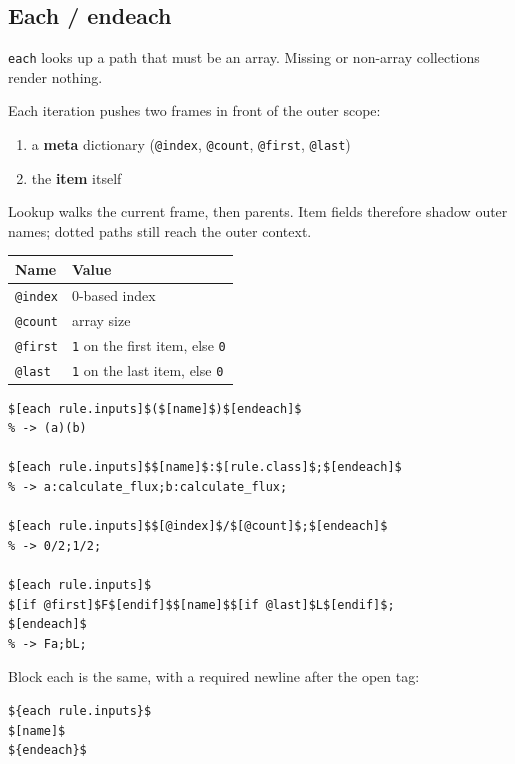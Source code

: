 \documentclass[11pt,letterpaper]{article}
\begin{document}
\subsection{Each / endeach}

\texttt{each} looks up a path that must be an array. Missing or non-array
collections render nothing.

Each iteration pushes two frames in front of the outer scope:

\begin{enumerate}[nosep]
  \item a \textbf{meta} dictionary (\texttt{@index}, \texttt{@count},
        \texttt{@first}, \texttt{@last})
  \item the \textbf{item} itself
\end{enumerate}

Lookup walks the current frame, then parents. Item fields therefore shadow
outer names; dotted paths still reach the outer context.

\begin{center}
\begin{tabular}{ll}
\toprule
Name & Value \\
\midrule
\texttt{@index} & 0-based index \\
\texttt{@count} & array size \\
\texttt{@first} & \texttt{1} on the first item, else \texttt{0} \\
\texttt{@last}  & \texttt{1} on the last item, else \texttt{0} \\
\bottomrule
\end{tabular}
\end{center}

\begin{lstlisting}[style=tmpl]
$[each rule.inputs]$($[name]$)$[endeach]$
% -> (a)(b)

$[each rule.inputs]$$[name]$:$[rule.class]$;$[endeach]$
% -> a:calculate_flux;b:calculate_flux;

$[each rule.inputs]$$[@index]$/$[@count]$;$[endeach]$
% -> 0/2;1/2;

$[each rule.inputs]$
$[if @first]$F$[endif]$$[name]$$[if @last]$L$[endif]$;
$[endeach]$
% -> Fa;bL;
\end{lstlisting}

Block each is the same, with a required newline after the open tag:

\begin{lstlisting}[style=tmpl]
${each rule.inputs}$
$[name]$
${endeach}$
\end{lstlisting}
\end{document}
